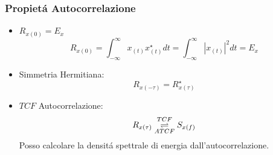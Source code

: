         \subsubsection{Propietá Autocorrelazione}
            \begin{itemize}
                \item {$R_{x(0)} = E_x$
                    \[
                        R_{x(0)} =\int_{-\infty}^{\infty}x_{(t)}x_{(t)}^\star dt =\int_{-\infty}^{\infty}|x_{(t)}|^2 dt = E_x   
                    \]
                }
                \item {Simmetria Hermitiana:
                    \[
                        R_{x(-\tau)} =R_{x(\tau)}^\star 
                    \]
                }
                \item {$TCF$ Autocorrelazione:
                    \[ 
                        R_{x(\tau)} \overunderset{TCF}{ATCF}{\rightleftharpoons} S_{x(f)}
                    \]
                    Posso calcolare la densitá spettrale di energia dall'autocorrelazione.
                }
            \end{itemize}